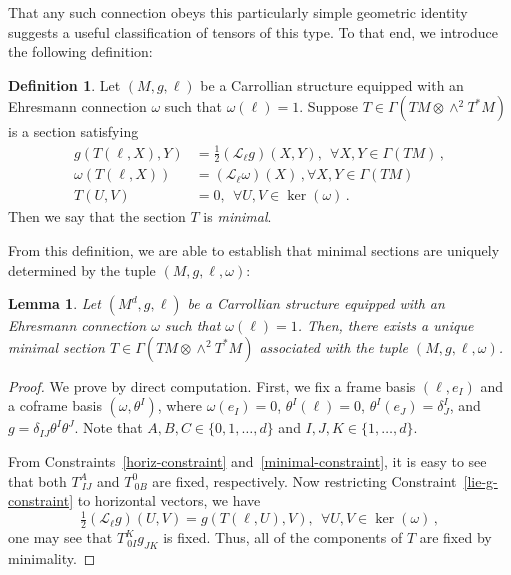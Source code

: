 \documentclass{article}
\newcommand{\ai}{A}
\newcommand{\bb}{B}
\newcommand{\cc}{C}
\newcommand{\ii}{I}
\newcommand{\jj}{J}
\newcommand{\kk}{K}
\newtheorem{lemma}[theorem]{Lemma}
\theoremstyle{definition}
\newtheorem{definition}[theorem]{Definition}
\theoremstyle{remark}
\begin{document}
That any such connection obeys this particularly simple geometric identity suggests a useful classification of tensors of this type. To that end, we introduce the following definition:
\begin{definition} \label{minimal-torsion-definition}
    Let $(M,g,\ell)$ be a Carrollian structure equipped with an Ehresmann connection $\omega$ such that $\omega(\ell) = 1$. Suppose $T \in \Gamma(TM \otimes \wedge^2 T^* M)$ is a section satisfying
        \begin{align}
        g(T(\ell,X), Y) &= \tfrac{1}{2} (\mathcal{L}_{\ell} g)(X,Y), ~~\forall X,Y \in \Gamma(T M)\,, \label{lie-g-constraint}\\
        \omega(T(\ell,X)) &= (\mathcal{L}_{\ell} \omega)(X) \,, \forall X,Y \in \Gamma(TM) \label{minimal-constraint} \\
        T(U,V) &= 0,~~\forall U,V \in \ker(\omega)\label{horiz-constraint}\,.
    \end{align}
    Then we say that the section $T$ is \textit{minimal}.
\end{definition}

From this definition, we are able to establish that minimal sections are uniquely determined by the tuple $(M,g,\ell,\omega)$:


\begin{lemma} \label{minimal-lemma}
    Let $(M^d,g,\ell)$ be a Carrollian structure equipped with an Ehresmann connection $\omega$ such that $\omega(\ell) = 1$. Then, there exists a unique minimal section $T \in \Gamma(TM \otimes \wedge^2 T^* M)$ associated with the tuple $(M,g,\ell,\omega)$.
\end{lemma}
\begin{proof}
    We prove by direct computation. First, we fix a frame basis $(\ell,e_{\ii})$ and a coframe basis $(\omega, \theta^\ii)$, where $\omega(e_\ii) = 0$, $\theta^\ii(\ell) = 0$, $\theta^\ii(e_\jj) = \delta^\ii_\jj$, and $g= \delta_{\ii\jj} \theta^\ii \theta^\jj$. Note that $\ai,\bb,\cc \in \{0, 1, \ldots, d\}$ and $\ii,\jj,\kk \in \{1, \ldots, d\}$.

    From Constraints~\ref{horiz-constraint} and~\ref{minimal-constraint},
    it is easy to see that both $T^\ai_{~\ii\jj}$ and $T^0_{~0\bb}$ are fixed, respectively.
    Now restricting Constraint~\ref{lie-g-constraint} to horizontal vectors, we have
    $$\tfrac{1}{2} (\mathcal{L}_{\ell} g)(U,V) = g(T(\ell,U), V) , ~~\forall U,V \in \ker (\omega)\,,$$
    one may see that $T^\kk_{~0\ii} g_{\jj\kk}$ is fixed.
    Thus, all of the components of $T$ are fixed by minimality.
\end{proof}
\end{document}
